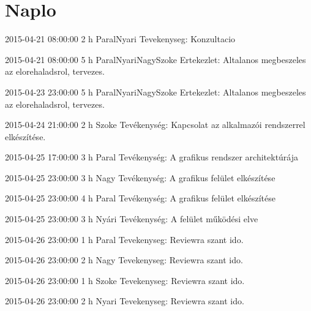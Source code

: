 \section{Naplo}
\begin{naplo}

            \bejegyzes
{2015-04-21 08:00:00}
            {2 h}
            {Paral\newline Nyari\newline}
            {Tevekenyseg: Konzultacio}
           

            \bejegyzes
{2015-04-21 08:00:00}
            {5 h}
            {Paral\newline Nyari\newline Nagy\newline Szoke}
            {Ertekezlet: Altalanos megbeszeles az elorehaladsrol, tervezes.}
           

            \bejegyzes
{2015-04-23 23:00:00}
            {5 h}
            {Paral\newline Nyari\newline Nagy\newline Szoke}
            {Ertekezlet: Altalanos megbeszeles az elorehaladsrol, tervezes.}
           

            \bejegyzes
{2015-04-24 21:00:00}
            {2 h}
            {Szoke}
            {Tevékenység: Kapcsolat az alkalmazói rendszerrel elkészítése.}
           

            \bejegyzes
{2015-04-25 17:00:00}
            {3 h}
            {Paral}
            {Tevékenység: A grafikus rendszer architektúrája}

            \bejegyzes
{2015-04-25 23:00:00}
            {3 h}
            {Nagy}
            {Tevékenység: A grafikus felület elkészítése}
           
            \bejegyzes
{2015-04-25 23:00:00}
            {4 h}
            {Paral}
            {Tevékenység: A grafikus felület elkészítése}
            
            \bejegyzes
{2015-04-25 23:00:00}
            {3 h}
            {Nyári}
            {Tevékenység: A felület működési elve}

            \bejegyzes
{2015-04-26 23:00:00}
            {1 h}
            {Paral}
            {Tevekenyseg: Reviewra szant ido.}
           

            \bejegyzes
{2015-04-26 23:00:00}
            {2 h}
            {Nagy}
            {Tevekenyseg: Reviewra szant ido.}
           

            \bejegyzes
{2015-04-26 23:00:00}
            {1 h}
            {Szoke}
            {Tevekenyseg: Reviewra szant ido.}
           

            \bejegyzes
{2015-04-26 23:00:00}
            {2 h}
            {Nyari}
            {Tevekenyseg: Reviewra szant ido.}
           
\end{naplo}
